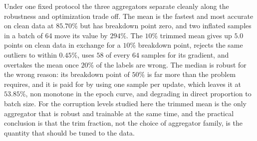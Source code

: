 \documentclass[12pt]{article}
\begin{document}
Under one fixed protocol the three aggregators separate cleanly along the robustness and optimization trade off. The mean is the fastest and most accurate on clean data at $85.70\%$ but has breakdown point zero, and two inflated samples in a batch of 64 move its value by $294\%$. The $10\%$ trimmed mean gives up $5.0$ points on clean data in exchange for a $10\%$ breakdown point, rejects the same outliers to within $0.45\%$, uses $58$ of every $64$ samples for its gradient, and overtakes the mean once $20\%$ of the labels are wrong. The median is robust for the wrong reason: its breakdown point of $50\%$ is far more than the problem requires, and it is paid for by using one sample per update, which leaves it at $53.85\%$, non monotone in the epoch curve, and degrading in direct proportion to batch size. For the corruption levels studied here the trimmed mean is the only aggregator that is robust and trainable at the same time, and the practical conclusion is that the trim fraction, not the choice of aggregator family, is the quantity that should be tuned to the data.
\end{document}

